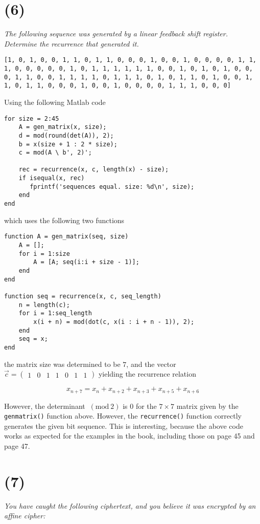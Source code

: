 \documentclass[12pt]{article}
\renewcommand{\mod}[1]{\mathrm{mod}\ #1}
\renewcommand{\pmod}[1]{\ (\mod{#1})}
\begin{document}
\section*{(6)} \textit{The following sequence was generated by a linear feedback shift register. Determine the recurrence that generated it.}

\texttt{[1, 0, 1, 0, 0, 1, 1, 0, 1, 1, 0, 0, 0, 1, 0, 0, 1, 0, 0, 0, 0, 1, 1,
1, 0, 0, 0, 0, 0, 1, 0, 1, 1, 1, 1, 1, 1, 0, 0, 1, 0, 1, 0, 1, 0, 0,
0, 1, 1, 0, 0, 1, 1, 1, 1, 0, 1, 1, 1, 0, 1, 0, 1, 1, 0, 1, 0, 0, 1,
1, 0, 1, 1, 0, 0, 0, 1, 0, 0, 1, 0, 0, 0, 0, 1, 1, 1, 0, 0, 0]}

Using the following Matlab code

\begin{verbatim}
for size = 2:45
    A = gen_matrix(x, size);
    d = mod(round(det(A)), 2);
    b = x(size + 1 : 2 * size);
    c = mod(A \ b', 2)';

    rec = recurrence(x, c, length(x) - size);
    if isequal(x, rec)
       fprintf('sequences equal. size: %d\n', size);
    end
end
\end{verbatim}

which uses the following two functions

\begin{verbatim}
function A = gen_matrix(seq, size)
    A = [];
    for i = 1:size
        A = [A; seq(i:i + size - 1)];
    end
end

function seq = recurrence(x, c, seq_length)
    n = length(c);
    for i = 1:seq_length
        x(i + n) = mod(dot(c, x(i : i + n - 1)), 2);
    end
    seq = x;
end
\end{verbatim}

the matrix size was determined to be $7$, and the vector $\vec{c} = \begin{pmatrix}1 & 0 & 1 & 1 & 0 & 1 & 1\end{pmatrix}$ yielding the recurrence relation

$$x_{n + 7} = x_n + x_{n + 2} + x_{n + 3} + x_{n + 5} + x_{n + 6}$$

However, the determinant $\pmod{2}$ is $0$ for the $7\times 7$ matrix given by the \texttt{gen\textunderscore{}matrix()} function above. However, the \texttt{recurrence()} function correctly generates the given bit sequence. This is interesting, because the above code works as expected for the examples in the book, including those on page 45 and page 47.

\section*{(7)} \textit{You have caught the following ciphertext, and you believe it was encrypted by an affine cipher:}
\end{document}

